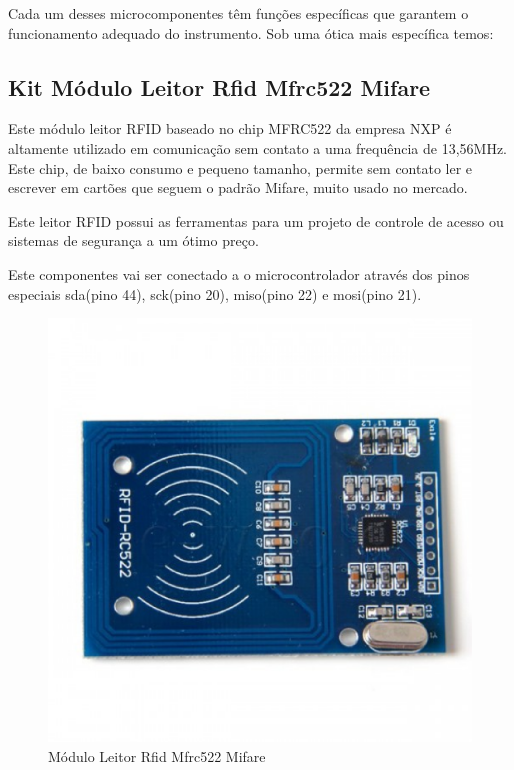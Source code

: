 Cada um desses microcomponentes têm funções específicas que garantem o funcionamento adequado do instrumento. Sob uma ótica mais específica temos:

\subsection{Kit Módulo Leitor Rfid Mfrc522 Mifare}


Este módulo leitor RFID baseado no chip MFRC522 da empresa NXP é altamente utilizado em comunicação sem contato a uma frequência de 13,56MHz. Este chip, de baixo consumo e pequeno tamanho, permite sem contato ler e escrever em cartões que seguem o padrão Mifare, muito usado no mercado.

Este leitor RFID possui as ferramentas para um projeto de controle de acesso ou sistemas de segurança a um ótimo preço.

Este componentes vai ser conectado a o microcontrolador através dos pinos especiais sda(pino 44), sck(pino 20), miso(pino 22) e mosi(pino 21).

\begin{figure}[!h]
  \centering
  \includegraphics[keepaspectratio=true,scale=0.5]{figuras/rfid.eps}
  \caption{Módulo Leitor Rfid Mfrc522 Mifare}
\end{figure}


